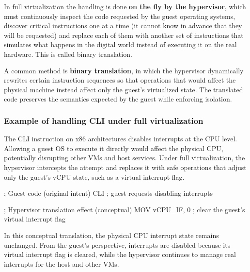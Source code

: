 In full virtualization the handling is done \textbf{on the fly by the hypervisor}, which must continuously inspect the code requested by the guest operating systems, discover critical instructions one at a time (it cannot know in advance that they will be requested) and replace each of them with another set of instructions that simulates what happens in the digital world instead of executing it on the real hardware. This is called binary translation.

A common method is \textbf{binary translation}, in which the hypervisor dynamically rewrites certain instruction sequences so that operations that would affect the physical machine instead affect only the guest's virtualized state. The translated code preserves the semantics expected by the guest while enforcing isolation.

\begin{center}
\end{center}

\subsubsection*{Example of handling CLI under full virtualization}

The CLI instruction on x86 architectures disables interrupts at the CPU level. Allowing a guest OS to execute it directly would affect the physical CPU, potentially disrupting other VMs and host services. Under full virtualization, the hypervisor intercepts the attempt and replaces it with safe operations that adjust only the guest's vCPU state, such as a virtual interrupt flag.

\begin{codeblock}
; Guest code (original intent)
CLI          ; guest requests disabling interrupts
\end{codeblock}

\begin{codeblock}
; Hypervisor translation effect (conceptual)
MOV vCPU_IF, 0   ; clear the guest's virtual interrupt flag
\end{codeblock}

In this conceptual translation, the physical CPU interrupt state remains unchanged. From the guest's perspective, interrupts are disabled because its virtual interrupt flag is cleared, while the hypervisor continues to manage real interrupts for the host and other VMs.

